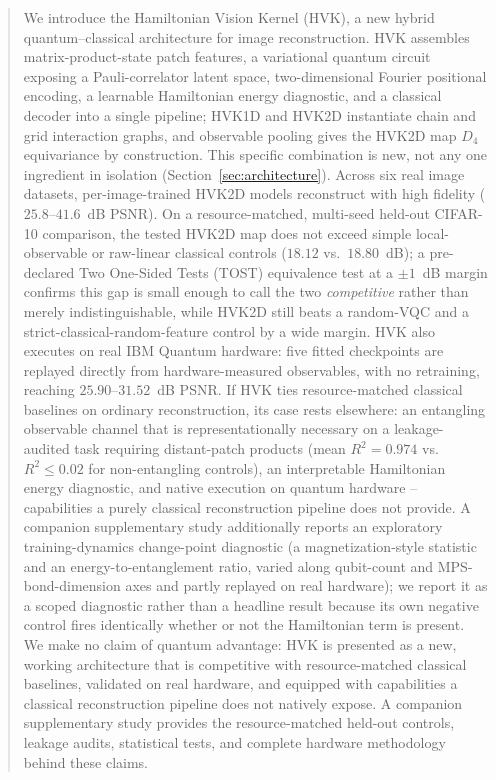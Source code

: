 \documentclass[11pt]{article}
\begin{document}
\begin{abstract}
We introduce the Hamiltonian Vision Kernel (HVK), a new hybrid quantum--classical architecture for image reconstruction. HVK assembles matrix-product-state patch features, a variational quantum circuit exposing a Pauli-correlator latent space, two-dimensional Fourier positional encoding, a learnable Hamiltonian energy diagnostic, and a classical decoder into a single pipeline; HVK1D and HVK2D instantiate chain and grid interaction graphs, and observable pooling gives the HVK2D map $D_4$ equivariance by construction. This specific combination is new, not any one ingredient in isolation (Section~\ref{sec:architecture}). Across six real image datasets, per-image-trained HVK2D models reconstruct with high fidelity ($25.8$--$41.6$~dB PSNR). On a resource-matched, multi-seed held-out CIFAR-10 comparison, the tested HVK2D map does not exceed simple local-observable or raw-linear classical controls ($18.12$ vs.\ $18.80$~dB); a pre-declared Two One-Sided Tests (TOST) equivalence test at a $\pm1$~dB margin confirms this gap is small enough to call the two \emph{competitive} rather than merely indistinguishable, while HVK2D still beats a random-VQC and a strict-classical-random-feature control by a wide margin. HVK also executes on real IBM Quantum hardware: five fitted checkpoints are replayed directly from hardware-measured observables, with no retraining, reaching $25.90$--$31.52$~dB PSNR. If HVK ties resource-matched classical baselines on ordinary reconstruction, its case rests elsewhere: an entangling observable channel that is representationally necessary on a leakage-audited task requiring distant-patch products (mean $R^2=0.974$ vs.\ $R^2\leq0.02$ for non-entangling controls), an interpretable Hamiltonian energy diagnostic, and native execution on quantum hardware -- capabilities a purely classical reconstruction pipeline does not provide. A companion supplementary study additionally reports an exploratory training-dynamics change-point diagnostic (a magnetization-style statistic and an energy-to-entanglement ratio, varied along qubit-count and MPS-bond-dimension axes and partly replayed on real hardware); we report it as a scoped diagnostic rather than a headline result because its own negative control fires identically whether or not the Hamiltonian term is present. We make no claim of quantum advantage: HVK is presented as a new, working architecture that is competitive with resource-matched classical baselines, validated on real hardware, and equipped with capabilities a classical reconstruction pipeline does not natively expose. A companion supplementary study provides the resource-matched held-out controls, leakage audits, statistical tests, and complete hardware methodology behind these claims.
\end{abstract}
\end{document}
